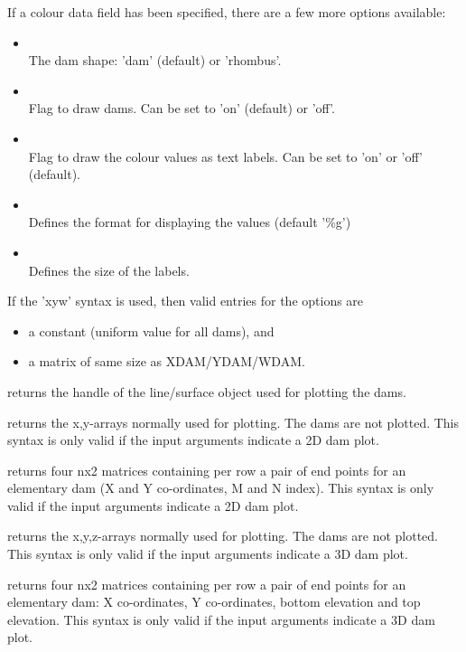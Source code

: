 If a colour data field has been specified, there are a few more options available:

\begin{itemize}
\item {} \\
The dam shape: 'dam' (default) or 'rhombus'.
\item {}\\
Flag to draw dams.
Can be set to 'on' (default) or 'off'.
\item {}\\
Flag to draw the colour values as text labels.
Can be set to 'on' or 'off' (default).
\item {}\\
Defines the format for displaying the values (default '\%g')
\item {}\\
Defines the size of the labels.
\end{itemize}

If the 'xyw' syntax is used, then valid entries for the options are
\begin{itemize}
\item a constant (uniform value for all dams), and
\item a matrix of same size as XDAM/YDAM/WDAM.
\end{itemize}

 returns the handle of the line/surface object used for plotting the dams.

 returns the x,y-arrays normally used for plotting.
The dams are not plotted.
This syntax is only valid if the input arguments indicate a 2D dam plot.

 returns four nx2 matrices containing per row a pair of end points for an elementary dam (X and Y co-ordinates, M and N index).
This syntax is only valid if the input arguments indicate a 2D dam plot.

 returns the x,y,z-arrays normally used for plotting.
The dams are not plotted.
This syntax is only valid if the input arguments indicate a 3D dam plot.

 returns four nx2 matrices containing per row a pair of end points for an elementary dam: X co-ordinates, Y co-ordinates, bottom elevation and top elevation.
This syntax is only valid if the input arguments indicate a 3D dam plot.

